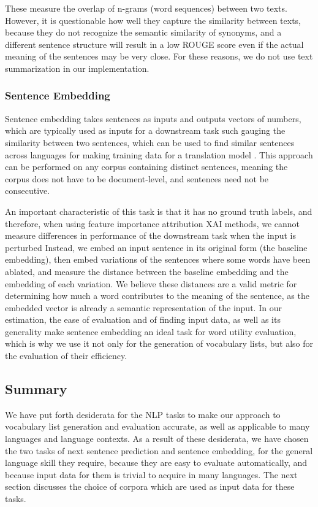 These measure the overlap of n-grams (word sequences) between two texts.
However, it is questionable how well they capture the similarity between texts, because they do not recognize the semantic similarity of synonyms, and a different sentence structure will result in a low ROUGE score even if the actual meaning of the sentences may be very close.
For these reasons, we do not use text summarization in our implementation.


\subsubsection{Sentence Embedding}
Sentence embedding takes sentences as inputs and outputs vectors of numbers, which are typically used as inputs for a downstream task such gauging the similarity between two sentences, which can be used to find similar sentences across languages for making training data for a translation model \cite{artetxeMassivelyMultilingualSentence2019} \cite{reimersMakingMonolingualSentence2020}.
This approach can be performed on any corpus containing distinct sentences, meaning the corpus does not have to be document-level, and sentences need not be consecutive.

An important characteristic of this task is that it has no ground truth labels, and therefore, when using feature importance attribution XAI methods, we cannot measure differences in performance of the downstream task when the input is perturbed
Instead, we embed an input sentence in its original form (the baseline embedding), then embed variations of the sentences where some words have been ablated, and measure the distance between the baseline embedding and the embedding of each variation.
We believe these distances are a valid metric for determining how much a word contributes to the meaning of the sentence, as the embedded vector is already a semantic representation of the input.
In our estimation, the ease of evaluation and of finding input data, as well as its generality make sentence embedding an ideal task for word utility evaluation, which is why we use it not only for the generation of vocabulary lists, but also for the evaluation of their efficiency.

\subsection{Summary}
We have put forth desiderata for the NLP tasks to make our approach to vocabulary list generation and evaluation accurate, as well as applicable to many languages and language contexts.
As a result of these desiderata, we have chosen the two tasks of next sentence prediction and sentence embedding, for the general language skill they require, because they are easy to evaluate automatically, and because input data for them is trivial to acquire in many languages.
The next section discusses the choice of corpora which are used as input data for these tasks.


